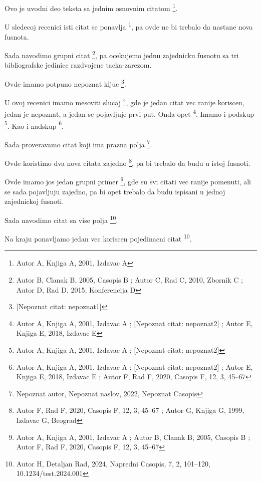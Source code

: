 \documentclass{article}
\begin{document}
Ovo je uvodni deo teksta sa jednim osnovnim citatom \footnote{Autor A, Knjiga A, 2001, Izdavac A}.

U sledecoj recenici isti citat se ponavlja \textsuperscript{1}, pa ovde ne bi trebalo da nastane nova fusnota.

Sada navodimo grupni citat \footnote{Autor B, Clanak B, 2005, Casopis B ; Autor C, Rad C, 2010, Zbornik C ; Autor D, Rad D, 2015, Konferencija D}, pa ocekujemo jednu zajednicku fusnotu sa tri bibliografske jedinice razdvojene tacka-zarezom.

Ovde imamo potpuno nepoznat kljuc \footnote{[Nepoznat citat: nepoznat1]}.

U ovoj recenici imamo mesoviti slucaj \footnote{Autor A, Knjiga A, 2001, Izdavac A ; [Nepoznat citat: nepoznat2] ; Autor E, Knjiga E, 2018, Izdavac E}, gde je jedan citat vec ranije koriscen, jedan je nepoznat, a jedan se pojavljuje prvi put.
Onda opet \textsuperscript{4}.
Imamo i podskup \footnote{Autor A, Knjiga A, 2001, Izdavac A ; [Nepoznat citat: nepoznat2]}.
Kao i nadskup \footnote{Autor A, Knjiga A, 2001, Izdavac A ; [Nepoznat citat: nepoznat2] ; Autor E, Knjiga E, 2018, Izdavac E ; Autor F, Rad F, 2020, Casopis F, 12, 3, 45--67}.

Sada proveravamo citat koji ima prazna polja \footnote{Nepoznat autor, Nepoznat naslov, 2022, Nepoznat Casopis}.

Ovde koristimo dva nova citata zajedno \footnote{Autor F, Rad F, 2020, Casopis F, 12, 3, 45--67 ; Autor G, Knjiga G, 1999, Izdavac G, Beograd}, pa bi trebalo da budu u istoj fusnoti.

Ovde imamo jos jedan grupni primer \footnote{Autor A, Knjiga A, 2001, Izdavac A ; Autor B, Clanak B, 2005, Casopis B ; Autor F, Rad F, 2020, Casopis F, 12, 3, 45--67}, gde su svi citati vec ranije pomenuti, ali se sada pojavljuju zajedno, pa bi opet trebalo da budu ispisani u jednoj zajednickoj fusnoti.

Sada navodimo citat sa vise polja \footnote{Autor H, Detaljan Rad, 2024, Napredni Casopis, 7, 2, 101--120, 10.1234/test.2024.001}.

Na kraju ponavljamo jedan vec koriscen pojedinacni citat \textsuperscript{10}.
\end{document}
